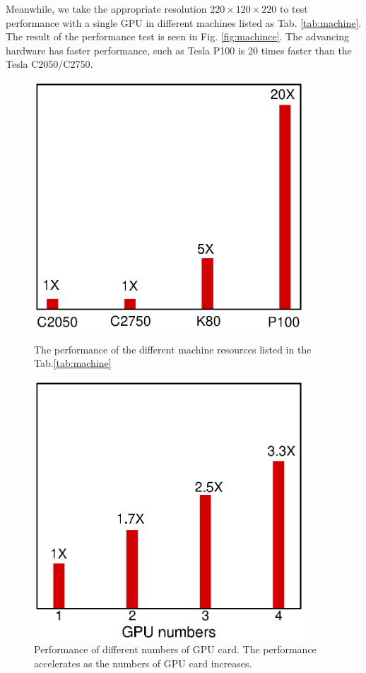 \documentclass[10pt]{elsarticle}
\begin{document}
\begin{itemize}
Meanwhile, we take the appropriate resolution $220\times120\times220$ to test performance with a single GPU in different machines listed as Tab. \ref{tab:machine}. The result of the performance test is seen in Fig. \ref{fig:machince}. The advancing hardware has faster performance, such as Tesla P100 is 20 times faster than the Tesla C2050/C2750.
\begin{figure}[!htpb]
\begin{minipage}{0.5\textwidth}
  \centering
  \includegraphics[width=0.9\textwidth]{machince.eps}
  \caption{The performance of the different machine resources listed in the Tab.\ref{tab:machine}}
 \label{fig:machince}
\end{minipage}
\begin{minipage}{0.5\textwidth}
  \centering
  \includegraphics[width=0.9\textwidth]{multigpu.eps}
\caption{Performance of different numbers of GPU card. The performance accelerates as the numbers of GPU card increases.}
\label{fig:multigpu}
\end{minipage}
\end{figure}


\end{itemize}
\end{document}
